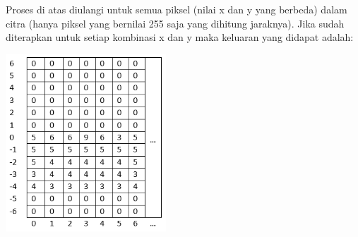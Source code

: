 \noindent Proses di atas diulangi untuk semua piksel (nilai x dan y yang berbeda) dalam citra (hanya piksel yang bernilai 255 saja yang dihitung jaraknya). Jika sudah diterapkan untuk setiap kombinasi x dan y maka keluaran yang didapat adalah:

\begin{adjustbox}{width=1\textwidth}
	\noindent\begin{minipage}{\linewidth}
		\centering\includegraphics[width=6cm]{images/AccumulatorSpace2.PNG}
		\label{tab:AccumulatorSpaceAfterAllVoting}
	\end{minipage}
\end{adjustbox}\\

